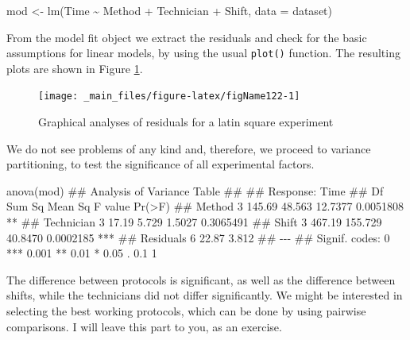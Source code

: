 \documentclass[a4paper,12pt,oneside]{book}
\newenvironment{Shaded}{\begin{snugshade}}{\end{snugshade}}
\newcommand{\SpecialCharTok}[1]{#1}
\newcommand{\DocumentationTok}[1]{#1}
\newcommand{\OtherTok}[1]{#1}
\newcommand{\FunctionTok}[1]{#1}
\newcommand{\AttributeTok}[1]{#1}
\newcommand{\NormalTok}[1]{#1}
\begin{document}
\begin{Shaded}
\begin{Highlighting}[]
\NormalTok{mod }\OtherTok{\textless{}{-}} \FunctionTok{lm}\NormalTok{(Time }\SpecialCharTok{\textasciitilde{}}\NormalTok{ Method }\SpecialCharTok{+}\NormalTok{ Technician }\SpecialCharTok{+}\NormalTok{ Shift, }\AttributeTok{data =}\NormalTok{ dataset)}
\end{Highlighting}
\end{Shaded}

From the model fit object we extract the residuals and check for the basic assumptions for linear models, by using the usual \texttt{plot()} function. The resulting plots are shown in Figure \ref{fig:figName122}.

\begin{figure}

{\centering \texttt{[image: \_main\_files/figure-latex/figName122-1]} 

}

\caption{Graphical analyses of residuals for a latin square experiment}\label{fig:figName122}
\end{figure}

We do not see problems of any kind and, therefore, we proceed to variance partitioning, to test the significance of all experimental factors.

\begin{Shaded}
\begin{Highlighting}[]
\FunctionTok{anova}\NormalTok{(mod)}
\DocumentationTok{\#\# Analysis of Variance Table}
\DocumentationTok{\#\# }
\DocumentationTok{\#\# Response: Time}
\DocumentationTok{\#\#            Df Sum Sq Mean Sq F value    Pr(\textgreater{}F)    }
\DocumentationTok{\#\# Method      3 145.69  48.563 12.7377 0.0051808 ** }
\DocumentationTok{\#\# Technician  3  17.19   5.729  1.5027 0.3065491    }
\DocumentationTok{\#\# Shift       3 467.19 155.729 40.8470 0.0002185 ***}
\DocumentationTok{\#\# Residuals   6  22.87   3.812                      }
\DocumentationTok{\#\# {-}{-}{-}}
\DocumentationTok{\#\# Signif. codes:  0 \textquotesingle{}***\textquotesingle{} 0.001 \textquotesingle{}**\textquotesingle{} 0.01 \textquotesingle{}*\textquotesingle{} 0.05 \textquotesingle{}.\textquotesingle{} 0.1 \textquotesingle{} \textquotesingle{} 1}
\end{Highlighting}
\end{Shaded}

The difference between protocols is significant, as well as the difference between shifts, while the technicians did not differ significantly. We might be interested in selecting the best working protocols, which can be done by using pairwise comparisons. I will leave this part to you, as an exercise.
\end{document}
